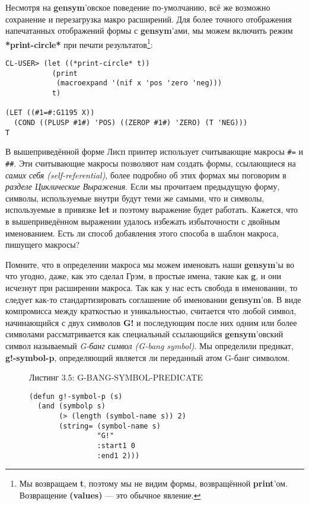 Несмотря на \textbf{gensym}'овское поведение по-умолчанию, всё же возможно сохранение и перезагрузка макро расширений. Для более точного отображения напечатанных отображений формы с \textbf{gensym}'ами, мы можем включить режим \textbf{*print-circle*} при печати результатов\footnote{Мы возвращаем \textbf{t}, поэтому мы не видим формы, возвращённой \textbf{print}'ом. Возвращение \textbf{(values)} --- это обычное явление.}:

\begin{verbatim}
CL-USER> (let ((*print-circle* t))
           (print
            (macroexpand '(nif x 'pos 'zero 'neg)))
           t)

(LET ((#1=#:G1195 X))
  (COND ((PLUSP #1#) 'POS) ((ZEROP #1#) 'ZERO) (T 'NEG))) 
T
\end{verbatim}

В вышеприведённой форме Лисп принтер использует считывающие макросы \verb"#=" и \verb"##". Эти считывающие макросы позволяют нам создать формы, ссылающиеся на \emph{самих себя (self-referential)}, более подробно об этих формах мы поговорим в \emph{разделе Циклические Выражения}. Если мы прочитаем предыдущую форму, символы, используемые внутри будут теми же самыми, что и символы, используемые в привязке \textbf{let} и поэтому выражение будет работать. Кажется, что в вышеприведённом выражении удалось избежать избыточности с двойным именованием. Есть ли способ добавления этого способа в шаблон макроса, пишущего макросы?

Помните, что в определении макроса мы можем именовать наши \textbf{gensym}'ы во что угодно, даже, как это сделал Грэм, в простые имена, такие как \textbf{g}, и они исчезнут при расширении макроса. Так как у нас есть свобода в именовании, то следует как-то стандартизировать соглашение об именовании \textbf{gensym}'ов. В виде компромисса между краткостью и уникальностью, считается что любой символ, начинающийся с двух символов \textbf{G!} и последующим после них одним или более символами рассматривается как специальный ссылающийся \textbf{gensym}'овский символ называемый \emph{G-банг символ (G-bang symbol)}. Мы определили предикат, \textbf{g!-symbol-p}, определяющий является ли переданный атом G-банг символом.

\begin{figure}Листинг 3.5: G-BANG-SYMBOL-PREDICATE\label{listing_3.5}
\listbegin
\begin{verbatim}
(defun g!-symbol-p (s)
  (and (symbolp s)
       (> (length (symbol-name s)) 2)
       (string= (symbol-name s)
                "G!"
                :start1 0
                :end1 2)))
\end{verbatim}
\listend
\end{figure}

